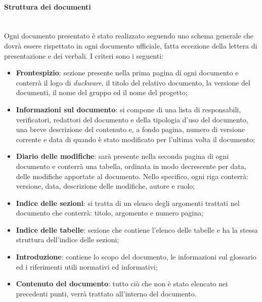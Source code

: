 \paragraph{Struttura dei documenti}\mbox{}\\[0.4cm]
Ogni documento presentato è stato realizzato seguendo uno schema generale che dovrà essere rispettato in ogni documento ufficiale, fatta eccezione della lettera di presentazione e dei verbali. I criteri sono i seguenti:
\begin{itemize}
    \item \textbf{Frontespizio}: sezione presente nella prima pagina di ogni documento e conterrà il logo di \emph{duckware}, il titolo del relativo documento, la versione del documenti, il nome del gruppo ed il nome del progetto;
    \item \textbf{Informazioni sul documento}: si compone di una lista di responsabili, verificatori, redattori del documento e della tipologia d’uso del documento, una breve descrizione del contenuto e, a fondo pagina, numero di versione corrente e data di quando è stato modificato per l'ultima volta il documento;
    \item \textbf{Diario delle modifiche}: sarà presente nella seconda pagina di ogni documento e conterrà una tabella, ordinata in modo decrescente per data, delle modifiche apportate al documento. Nello specifico, ogni riga conterrà: versione, data, descrizione delle modifiche, autore e ruolo;
    \item \textbf{Indice delle sezioni}: si tratta di un elenco degli argomenti trattati nel documento che conterrà: titolo, argomento e numero pagina;
    \item \textbf{Indice delle tabelle}: sezione che contiene l’elenco delle tabelle e ha la stessa struttura dell’indice delle sezioni;
    \item \textbf{Introduzione}: contiene lo scopo del documento, le informazioni sul glossario ed i riferimenti utili normativi ed informativi;
    \item \textbf{Contenuto del documento}: tutto ciò che non è stato elencato nei precedenti punti, verrà trattato all’interno del documento.
\end{itemize}

